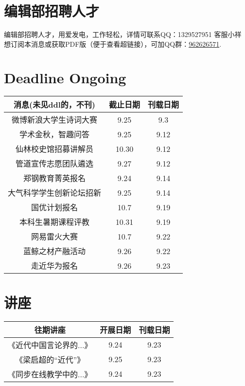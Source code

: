 \documentclass[letterpaper, 12pt]{article}
\begin{document}
\begin{multicols}{2}
\section{编辑部招聘人才}
编辑部招聘人才，用爱发电，工作轻松，详情可联系QQ：1329527951 客服小祥\\想订阅本消息或获取PDF版（便于查看超链接），可加QQ群：\href{https://qm.qq.com/q/FGX1VYCrGS}{962626571}.
\section{Deadline Ongoing}
\begin{tabular}{|c|c|c|}
    \hline
    消息(未见ddl的，不刊) & 截止日期 & 刊载日期\\
    \hline\hline
    微博新浪大学生诗词大赛 & 9.25 & 9.3\\
    学术金秋，智趣问答 & 9.25 & 9.12\\
    仙林校史馆招募讲解员 & 10.30 & 9.12\\
    管道宣传志愿团队遴选 & 9.27 & 9.12\\
    郑钢教育菁英报名 & 9.24 & 9.14\\
    大气科学学生创新论坛招新 & 9.25 & 9.14\\
    国优计划报名 & 10.7 & 9.19\\
    本科生暑期课程评教 & 10.31 & 9.19\\
    网易雷火大赛 & 10.7 & 9.22\\
    蓝鲸之材产融活动 & 9.26 & 9.22\\
    走近华为报名 & 9.26 & 9.23\\
    
    \hline
\end{tabular}
\section{讲座}
\begin{tabular}{|c|c|c|}
    \hline
    往期讲座 & 开展日期 & 刊载日期\\
    \hline\hline
    《近代中国言论界的...》 & 9.24 & 9.23\\
    《梁启超的“近代”》 & 9.25 & 9.23\\
    《同步在线教学中的...》 & 9.24 & 9.23\\
      \hline
\end{tabular}\\\\




\end{multicols}
\end{document}
